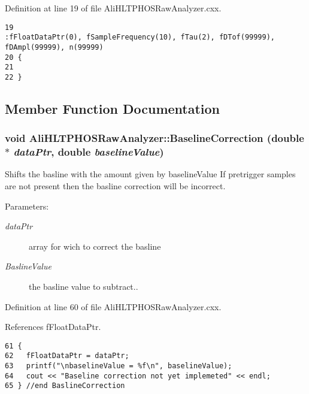 Definition at line 19 of file Ali\-HLTPHOSRaw\-Analyzer.cxx.

\footnotesize\begin{verbatim}19                                                                         :fFloatDataPtr(0), fSampleFrequency(10), fTau(2), fDTof(99999), fDAmpl(99999), n(99999)
20 {
21 
22 }
\end{verbatim}\normalsize 




\subsection{Member Function Documentation}
\subsubsection{\setlength{\rightskip}{0pt plus 5cm}void Ali\-HLTPHOSRaw\-Analyzer::Baseline\-Correction (double $\ast$ {\em data\-Ptr}, double {\em baseline\-Value})}\label{classAliHLTPHOSRawAnalyzer_AliHLTPHOSRawAnalyzerPeakFindera8}


Shifts the basline with the amount given by baseline\-Value If pretrigger samples are not present then the basline correction will be incorrect. \begin{Desc}
\item[Parameters:]
\begin{description}
\item[{\em data\-Ptr}]array for wich to correct the basline \item[{\em Basline\-Value}]the basline value to subtract.. \end{description}
\end{Desc}


Definition at line 60 of file Ali\-HLTPHOSRaw\-Analyzer.cxx.

References f\-Float\-Data\-Ptr.

\footnotesize\begin{verbatim}61 {
62   fFloatDataPtr = dataPtr;   
63   printf("\nbaselineValue = %f\n", baselineValue);
64   cout << "Baseline correction not yet implemeted" << endl;
65 } //end BaslineCorrection
\end{verbatim}\normalsize 


